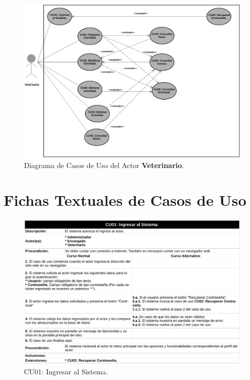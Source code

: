 \documentclass[11pt,oneside]{book}
\begin{document}
\begin{figure}[tbhp]
\centerline{\includegraphics[scale=0.5]{figs/capitulo_2_analisis/Diagrama_CU_Veterinario.pdf}}
\caption{Diagrama de Casos de Uso del Actor \textbf{Veterinario}.}
\label{Ap104}
\end{figure}

\newpage
\clearpage
\section{Fichas Textuales de Casos de Uso}\label{ApFCU}

\begin{figure}[tbhp]
\centerline{\includegraphics[scale=0.6]{figs/capitulo_2_analisis/fichas_cu/pg_0001.pdf}}
\caption{CU01: Ingresar al Sistema.}
\label{Ap201}
\end{figure}
\end{document}
